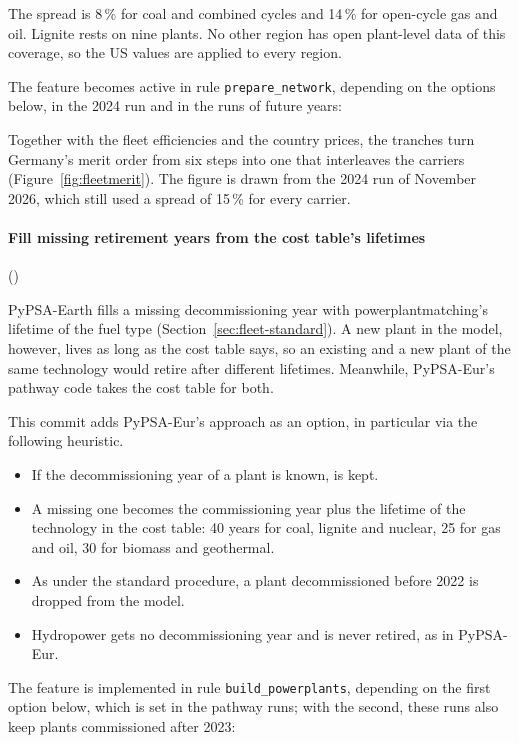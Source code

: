 \begin{table}[htb]
  \centering
  \small
  \caption{Efficiency spread of the US fleet of 2024 per carrier, from plant-level fuel use and generation \citep{eia923,eia860}; efficiencies on a higher-heating-value basis.
  The spread $s$ sets the efficiency of the model's three tranches relative to the fleet efficiency of each country.}
  \label{tab:fleetspread}
  
\end{table}

The spread is 8\,\% for coal and combined cycles and 14\,\% for open-cycle gas and oil.
Lignite rests on nine plants.
No other region has open plant-level data of this coverage, so the US values are applied to every region.

The feature becomes active in rule \texttt{prepare\_network}, depending on the options below, in the 2024 run and in the runs of future years:

Together with the fleet efficiencies and the country prices, the tranches turn Germany's merit order from six steps into one that interleaves the carriers (Figure~\ref{fig:fleetmerit}).
The figure is drawn from the 2024 run of November 2026, which still used a spread of 15\,\% for every carrier.

\paragraph{Fill missing retirement years from the cost table's lifetimes} ()

PyPSA-Earth fills a missing decommissioning year with powerplantmatching's lifetime of the fuel type (Section~\ref{sec:fleet-standard}).
A new plant in the model, however, lives as long as the cost table says, so an existing and a new plant of the same technology would retire after different lifetimes.
Meanwhile, PyPSA-Eur's pathway code takes the cost table for both.

This commit adds PyPSA-Eur's approach as an option, in particular via the following heuristic.
\begin{itemize}[nosep,leftmargin=*]
  \item If the decommissioning year of a plant is known, is kept.
  \item A missing one becomes the commissioning year plus the lifetime of the technology in the cost table: 40 years for coal, lignite and nuclear, 25 for gas and oil, 30 for biomass and geothermal.
  \item As under the standard procedure, a plant decommissioned before 2022 is dropped from the model.
  \item Hydropower gets no decommissioning year and is never retired, as in PyPSA-Eur.
\end{itemize}
The feature is implemented in rule \texttt{build\_powerplants}, depending on the first option below, which is set in the pathway runs; with the second, these runs also keep plants commissioned after 2023:

